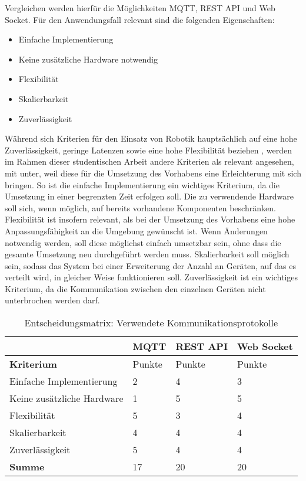 Vergleichen werden hierfür die Möglichkeiten MQTT, REST API und Web Socket. Für den Anwendungsfall relevant sind die folgenden Eigenschaften:
\begin{itemize}
  \item Einfache Implementierung
  \item Keine zusätzliche Hardware notwendig
  \item Flexibilität
  \item Skalierbarkeit
  \item Zuverlässigkeit
\end{itemize}

Während sich Kriterien für den Einsatz von Robotik hauptsächlich auf eine hohe Zuverlässigkeit, geringe Latenzen sowie eine hohe Flexibilität beziehen \cite{AMARAN2015400}, werden im Rahmen dieser studentischen Arbeit andere Kriterien als relevant angesehen, mit unter, weil diese für die Umsetzung des Vorhabens eine Erleichterung mit sich bringen. So ist die einfache Implementierung ein wichtiges Kriterium, da die Umsetzung in einer begrenzten Zeit erfolgen soll. Die zu verwendende Hardware soll sich, wenn möglich, auf bereits vorhandene Komponenten beschränken. Flexibilität ist insofern relevant, als bei der Umsetzung des Vorhabens eine hohe Anpassungsfähigkeit an die Umgebung gewünscht ist. Wenn Änderungen notwendig werden, soll diese möglichst einfach umsetzbar sein, ohne dass die gesamte Umsetzung neu durchgeführt werden muss. Skalierbarkeit soll möglich sein, sodass das System bei einer Erweiterung der Anzahl an Geräten, auf das es verteilt wird, in gleicher Weise funktionieren soll. Zuverlässigkeit ist ein wichtiges Kriterium, da die Kommunikation zwischen den einzelnen Geräten nicht unterbrochen werden darf.
\begin{table}[H]
  \renewcommand{\arraystretch}{1.2}
  \caption{Entscheidungsmatrix: Verwendete Kommunikationsprotokolle}
  \label{tab:decision-matrix-communication}
  \begin{tabularx}{\textwidth}{|X|X|X|X|}
      \hline
      & \textbf{MQTT} & \textbf{REST API} & \textbf{Web Socket} \\
      \hline
      \textbf{Kriterium} & Punkte & Punkte & Punkte \\
      \hline
      Einfache Implementierung & 2 & 4 & 3 \\
      \hline
      Keine zusätzliche Hardware & 1 & 5 & 5 \\
      \hline
      Flexibilität & 5 & 3 & 4 \\
      \hline
      Skalierbarkeit & 4 & 4 & 4 \\
      \hline
      Zuverlässigkeit & 5 & 4 & 4 \\
      \hline
      \rowcolor{gray!50}
      \textbf{Summe} & 17 & 20 & 20 \\
      \hline
  \end{tabularx}
\end{table}

